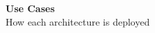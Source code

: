 
  




\begin{frame}[fragile]\frametitle{}
\begin{center}
{\Large \textbf{Use Cases }}\\[0.5em]
{\normalsize How each architecture is deployed}
\end{center}
\end{frame}

